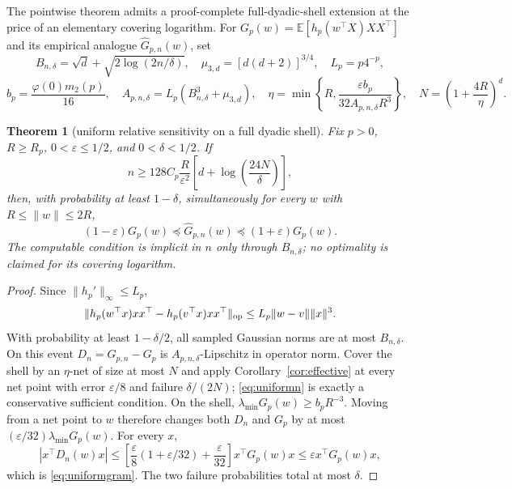 \documentclass[11pt]{article}
\newtheorem{theorem}{Theorem}[section]
\newcommand{\E}{\mathbb E}
\begin{document}
The pointwise theorem admits a proof-complete full-dyadic-shell extension at the price of an elementary covering
logarithm.
For $G_p(w)=\E[h_p(w^\top X)XX^\top]$ and its empirical analogue $\widehat G_{p,n}(w)$, set
\[
 B_{n,\delta}=\sqrt d+\sqrt{2\log(2n/\delta)},\quad
 \mu_{3,d}=[d(d+2)]^{3/4},\quad L_p=p4^{-p},
\]
\[
 b_p=\frac{\varphi(0)m_2(p)}{16},\quad
 A_{p,n,\delta}=L_p(B_{n,\delta}^3+\mu_{3,d}),\quad
 \eta=\min\left\{R,\frac{\varepsilon b_p}{32A_{p,n,\delta}R^3}\right\},\quad
 N=\left(1+\frac{4R}{\eta}\right)^d.
\]

\begin{theorem}[uniform relative sensitivity on a full dyadic shell]
\label{thm:uniformshell}
Fix $p>0$, $R\ge R_p$, $0<\varepsilon\le1/2$, and $0<\delta<1/2$.  If
\begin{equation}
 n\ge128C_p\frac{R}{\varepsilon^2}
 \left[d+\log\left(\frac{24N}{\delta}\right)\right],
 \label{eq:uniformn}
\end{equation}
then, with probability at least $1-\delta$, simultaneously for every $w$ with
$R\le\lVert w\rVert\le2R$,
\begin{equation}
 (1-\varepsilon)G_p(w)\preceq\widehat G_{p,n}(w)
 \preceq(1+\varepsilon)G_p(w).
 \label{eq:uniformgram}
\end{equation}
The computable condition is implicit in $n$ only through $B_{n,\delta}$; no optimality is claimed for its covering
logarithm.
\end{theorem}

\begin{proof}
Since $\lVert h_p'\rVert_\infty\le L_p$,
\[
 \lVert h_p(w^\top x)xx^\top-h_p(v^\top x)xx^\top\rVert_{\rm op}
 \le L_p\lVert w-v\rVert\lVert x\rVert^3.
\]
With probability at least $1-\delta/2$, all sampled Gaussian norms are at most $B_{n,\delta}$.  On this event
$D_n=\widehat G_{p,n}-G_p$ is $A_{p,n,\delta}$-Lipschitz in operator norm.  Cover the shell by an $\eta$-net of
size at most $N$ and apply Corollary~\ref{cor:effective} at every net point with error $\varepsilon/8$ and failure
$\delta/(2N)$; \eqref{eq:uniformn} is exactly a conservative sufficient condition.  On the shell,
$\lambda_{\min}G_p(w)\ge b_pR^{-3}$.  Moving from a net point to $w$ therefore changes both $D_n$ and $G_p$ by
at most $(\varepsilon/32)\lambda_{\min}G_p(w)$.  For every $x$,
\[
 |x^\top D_n(w)x|
 \le\left[\frac\varepsilon8(1+\varepsilon/32)+\frac\varepsilon{32}\right]x^\top G_p(w)x
 \le\varepsilon x^\top G_p(w)x,
\]
which is \eqref{eq:uniformgram}.  The two failure probabilities total at most $\delta$.
\end{proof}
\end{document}

